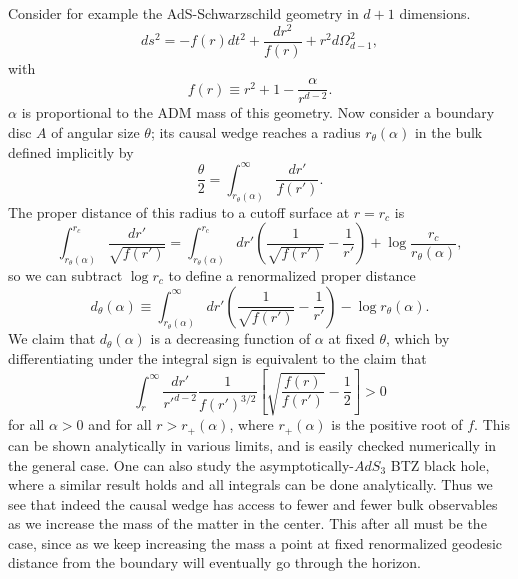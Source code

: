 \documentclass[11pt]{article}
\newcommand{\be}{\begin{equation}}
\newcommand{\ee}{\end{equation}}
\begin{document}
Consider for example the AdS-Schwarzschild geometry in $d+1$ dimensions.
\be
ds^2=-f(r)dt^2+\frac{dr^2}{f(r)}+r^2 d\Omega_{d-1}^2,
\ee
with 
\be
f(r)\equiv r^2+1-\frac{\alpha}{r^{d-2}}.
\ee
$\alpha$ is proportional to the ADM mass of this geometry.  Now consider a boundary disc $A$ of angular size $\theta$; its causal wedge reaches a radius $r_\theta(\alpha)$ in the bulk defined implicitly by
\be\label{rdef}
\frac{\theta}{2}=\int_{r_\theta(\alpha)}^\infty \frac{dr'}{f(r')}.
\ee
The proper distance of this radius to a cutoff surface at $r=r_c$ is 
\be
\int_{r_\theta(\alpha)}^{r_c}\frac{dr'}{\sqrt{f(r')}}=\int_{r_\theta(\alpha)}^{r_c}dr'\left(\frac{1}{\sqrt{f(r')}}-\frac{1}{r'}\right)+\log\frac{r_c}{r_\theta(\alpha)},
\ee
so we can subtract $\log r_c$  to define a renormalized proper distance
\be\label{ddef}
d_\theta(\alpha)\equiv \int_{r_\theta(\alpha)}^{\infty}dr'\left(\frac{1}{\sqrt{f(r')}}-\frac{1}{r'}\right)-\log r_\theta(\alpha).
\ee
We claim that $d_\theta(\alpha)$ is a decreasing function of $\alpha$ at fixed $\theta$, which by differentiating under the integral sign is equivalent to the claim that
\be
\int_{r}^\infty \frac{dr'}{r'^{d-2}}\frac{1}{f(r')^{3/2}}\left[\sqrt{\frac{f(r)}{f(r')}}-\frac{1}{2}\right]>0
\ee
for all $\alpha>0$ and for all $r>r_+(\alpha)$, where $r_+(\alpha)$ is the positive root of $f$.  This can be shown analytically in various limits, and is easily checked numerically in the general case.  One can also study the asymptotically-$AdS_3$ BTZ black hole, where a similar result holds and all integrals can be done analytically.  Thus we see that indeed the causal wedge has access to fewer and fewer bulk observables as we increase the mass of the matter in the center.  This after all must be the case, since as we keep increasing the mass a point at fixed renormalized geodesic distance from the boundary will eventually go through the horizon.
\end{document}
